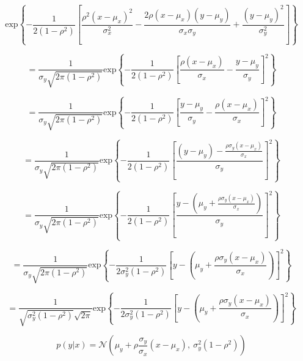 \documentclass[fleqn]{article}
\begin{document}
\begin{enumerate}
		\begin{equation*}		
			\text{exp}\left\{-\frac{1}{2(1-\rho^2)}\left[\frac{\rho^2(x-\mu_x)^2}{\sigma_x^2}-\frac{2\rho(x-\mu_x)(y-\mu_y)}{\sigma_x\sigma_y}+\frac{(y-\mu_y)^2}{\sigma_y^2}\right]\right\}
		\end{equation*}
	
		\begin{equation*}		
			= \frac{1}{\sigma_y\sqrt{2\pi(1-\rho^2)}}\text{exp}\left\{-\frac{1}{2(1-\rho^2)}\left[\frac{\rho(x-\mu_x)}{\sigma_x} - \frac{y - \mu_y}{\sigma_y}\right]^2\right\}
		\end{equation*}
		
		\begin{equation*}		
			= \frac{1}{\sigma_y\sqrt{2\pi(1-\rho^2)}}\text{exp}\left\{-\frac{1}{2(1-\rho^2)}\left[\frac{y - \mu_y}{\sigma_y} - \frac{\rho(x-\mu_x)}{\sigma_x}\right]^2\right\}
		\end{equation*}
		
		\begin{equation*}		
			= \frac{1}{\sigma_y\sqrt{2\pi(1-\rho^2)}}\text{exp}\left\{-\frac{1}{2(1-\rho^2)}\left[\frac{(y - \mu_y) - \frac{\rho\sigma_y(x-\mu_x)}{\sigma_x}}{\sigma_y}\right]^2\right\}
		\end{equation*}
		
		\begin{equation*}		
			= \frac{1}{\sigma_y\sqrt{2\pi(1-\rho^2)}}\text{exp}\left\{-\frac{1}{2(1-\rho^2)}\left[\frac{y - \left(\mu_y + \frac{\rho\sigma_y(x-\mu_x)}{\sigma_x}\right)}{\sigma_y}\right]^2\right\}
		\end{equation*}
		
		\begin{equation*}		
			= \frac{1}{\sigma_y\sqrt{2\pi(1-\rho^2)}}\text{exp}\left\{-\frac{1}{2\sigma_y^2(1-\rho^2)}\left[y - \left(\mu_y + \frac{\rho\sigma_y(x-\mu_x)}{\sigma_x}\right)\right]^2\right\}
		\end{equation*}
		
		\begin{equation*}		
			= \frac{1}{\sqrt{\sigma_y^2(1-\rho^2)}\sqrt{2\pi}}\text{exp}\left\{-\frac{1}{2\sigma_y^2(1-\rho^2)}\left[y - \left(\mu_y + \frac{\rho\sigma_y(x-\mu_x)}{\sigma_x}\right)\right]^2\right\}
		\end{equation*}
		
		\begin{equation*}
			p(y|x) = \mathcal{N}\left(\mu_y + \rho\frac{\sigma_y}{\sigma_x}(x-\mu_x),\:\sigma_y^2(1 - \rho^2)\right)
		\end{equation*}
		

\end{enumerate}
\end{document}
